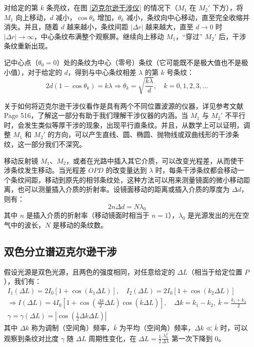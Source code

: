 \documentclass[UTF8]{report}
\theoremstyle{MyLineTheoremStyle} %
\theoremstyle{MyBlockTheoremStyle} %
\theoremstyle{MySubsubsectionStyle} %
\begin{document}
对给定的第 $k$ 条亮纹，在图 \ref{迈克尔逊干涉仪} 的情况下（$M_1$ 在 $M_2'$ 下方），将 $M_1$ 向上移动，$d$ 减小，$\cos \theta_k$ 增加，$\theta_k$ 减小，条纹向中心移动，直至完全收缩并消失。并且，随着 $d$ 越来越小，条纹间距 $| \Delta r |$ 越来越大，直至 $d \to 0$ 时 $| \Delta r | \to \infty$，中心条纹布满整个观察屏。继续向上移动 $M_1$，“穿过” $M_2'$ 后，干涉条纹重新出现。

记中心点（$\theta_0 = 0$）处的条纹为中心（零号）条纹（它可能既不是极大值也不是极小值），对于给定的 $d$，得到与中心条纹相差 $\lambda$ 的第 $k$ 号条纹：
\begin{equation}
2d (1 - \cos \theta_k) = k \lambda \Longrightarrow \theta_k = \sqrt{\frac{k\lambda}{d}},\quad k = 0, 1, 2, 3, ... 
\end{equation}

关于如何将迈克尔逊干涉仪看作是具有两个不同位置波源的仪器，详见参考文献 \cite{Optics} Page 516，了解这一部分有助于我们理解干涉仪器的内涵。当 $M_1$ 与 $M_2'$ 不平行时，会发生类似等厚干涉的现象，出现平行直条纹。并且，从数学上可以证明，调整 $M_1$ 和 $M_2'$ 的方向，可以产生直线、圆、椭圆、抛物线或双曲线形的干涉条纹，这一部分我们不深究。

移动反射镜 $M_1$、$M_2$，或者在光路中插入其它介质，可以改变光程差，从而使干涉条纹发生移动。当光程差 $OPD$ 的改变量达到 $\lambda$ 时，每条干涉条纹都会移动一个条纹间距，移动到原先的相邻条纹处，这种方法可以用来测量镜面的微小移动距离，也可以测量插入介质的折射率。设镜面移动的距离或插入介质的厚度为 $\Delta d$，则有：
\begin{equation}
2n\Delta d = N\lambda_0
\end{equation}
其中 $n$ 是插入介质的折射率（移动镜面时相当于 $n=1$），$\lambda_0$ 是光源发出的光在空气中的波长，$N$ 是移动的条纹数。

\subsection{双色分立谱迈克尔逊干涉}\label{双色谱迈克尔逊干涉}

假设光源是双色光源，且两色的强度相同，对任意给定的 $\Delta L$（相当于给定位置 $P$），我们有：
\begin{gather}
I_1(\Delta L) = 2I_0 \left[1 + \cos \left(k_1 \Delta L\right)\right],\quad I_2(\Delta L) = 2I_0 \left[1 + \cos \left(k_2 \Delta L\right)\right] \\ 
\Longrightarrow I(\Delta L) = 4 I_0 \left[ 1 + \cos \left(\frac{\Delta k}{2}\Delta L\right)\cos(\overline{k} \Delta L) \right],\quad \Delta k = k_1 - k_2,\ \overline{k} = \frac{k_1 + k_2}{2} \\ 
\gamma = \gamma (\Delta L) = \left|\cos \left(\frac{1}{2}\Delta k \Delta L\right) \right|
\end{gather}
其中 $\Delta k$ 称为调制（空间角）频率，$\overline{k}$ 为平均（空间角）频率，$\Delta k \ll \overline{k}$ 时，可以观察到条纹对比度 $\gamma$ 随 $\Delta L$ 周期性变化，在 $\Delta L = \frac{1}{2} \frac{\lambda_0^2}{\Delta \lambda}$ 第一次下降到 0。
\end{document}
